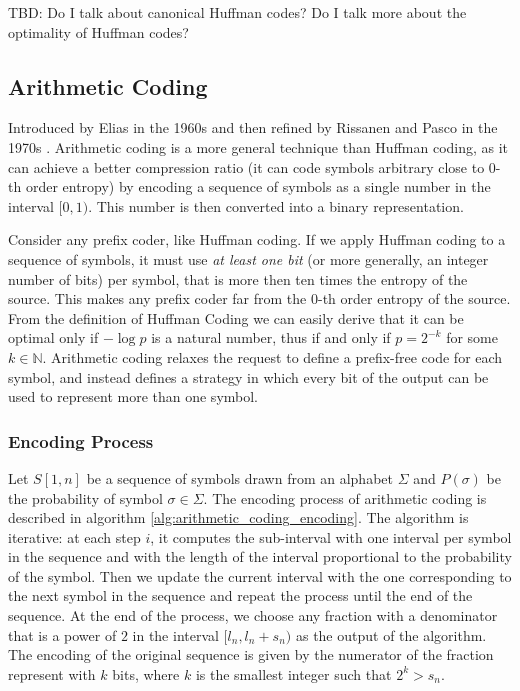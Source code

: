 TBD: Do I talk about canonical Huffman codes? Do I talk more about the optimality of Huffman codes?

\subsection{Arithmetic Coding}

Introduced by Elias in the 1960s and then refined by Rissanen and Pasco in the 1970s \cite{pasco1976source}. Arithmetic coding is a more general technique than Huffman coding, as it can achieve a better compression ratio (it can code symbols arbitrary close to 0-th order entropy) by encoding a sequence of symbols as a single number in the interval $[0,1)$. This number is then converted into a binary representation. \vspace{0.4cm}

\noindent Consider any prefix coder, like Huffman coding. If we apply Huffman coding to a sequence of symbols, it must use \emph{at least one bit} (or more generally, an integer number of bits) per symbol, that is more then ten times the entropy of the source. This makes any prefix coder far from the $0$-th order entropy of the source. From the definition of Huffman Coding we can easily derive that it can be optimal only if $-\log p$ is a natural number, thus if and only if $p = 2^{-k}$ for some $k \in \mathbb{N}$. Arithmetic coding relaxes the request to define a prefix-free code for each symbol, and instead defines a strategy in which every bit of the output can be used to represent more than one symbol. \vspace{0.4cm}


\subsubsection*{Encoding Process}
Let $S[1,n]$ be a sequence of symbols drawn from an alphabet $\Sigma$ and $P(\sigma)$ be the probability of symbol $\sigma \in \Sigma$. The encoding process of arithmetic coding is described in algorithm \ref{alg:arithmetic_coding_encoding}. The algorithm is iterative: at each step $i$, it computes the sub-interval with one interval per symbol in the sequence and with the length of the interval proportional to the probability of the symbol. Then we update the current interval with the one corresponding to the next symbol in the sequence and repeat the process until the end of the sequence. At the end of the process, we choose any fraction with a denominator that is a power of $2$ in the interval $[l_n, l_n + s_n)$ as the output of the algorithm. The encoding of the original sequence is given by the numerator of the fraction represent with $k$ bits, where $k$ is the smallest integer such that $2^k > s_n$.

